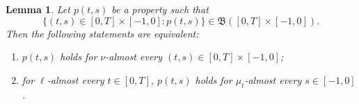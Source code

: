 \documentclass[reqno]{amsart}
\theoremstyle{plain}
\newtheorem{lemma}{Lemma}[section]
\numberwithin{equation}{section}
\numberwithin{definition}{section}
\begin{document}
\begin{lemma}\label{lemma:p-formula}
Let $p(t,s)$ be a property such that
\begin{equation*}
        \{(t,s)\in[0,T]\times[-1,0]:p(t,s)\}
    \in\mathfrak B([0,T]\times[-1,0]).
\end{equation*}
Then the following statements are equivalent:
\begin{enumerate}[label=\textup{(}\roman*\textup{)}, ref=\textup{(}\emph{\roman*}\textup{)}]
    \item\label{lemma:p-formula-i} $p(t,s)$ holds for $\nu$-almost every
          $(t,s)\in[0,T]\times[-1,0]$;
    \item\label{lemma:p-formula-ii} for $\ell$-almost every $t\in[0,T]$,
          $p(t,s)$ holds for $\mu_t$-almost every
          $s\in[-1,0]$.
\end{enumerate}
\end{lemma}
\end{document}

